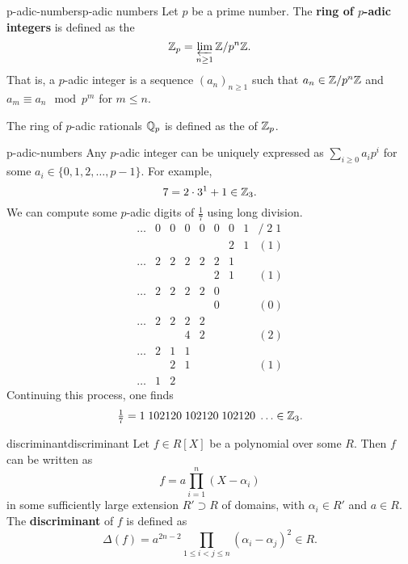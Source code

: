 \begin{topic}{p-adic-numbers}{p-adic numbers}
    Let $p$ be a prime number. The \textbf{ring of $p$-adic integers} is defined as the 
    \[ \mathbb{Z}_p = \varprojlim_{n \ge 1} \mathbb{Z} / p^n \mathbb{Z} . \]
    That is, a $p$-adic integer is a sequence $(a_n)_{n \ge 1}$ such that $a_n \in \mathbb{Z} / p^n \mathbb{Z}$ and $a_m \equiv a_n \mod p^m$ for $m \le n$.
    
    The ring of $p$-adic rationals $\mathbb{Q}_p$ is defined as the  of $\mathbb{Z}_p$.
\end{topic}

\begin{example}{p-adic-numbers}
    Any $p$-adic integer can be uniquely expressed as $\sum_{i \ge 0} a_i p^i$ for some $a_i \in \{ 0, 1, 2, \ldots, p - 1 \}$. For example,
    \[ 7 = 2 \cdot 3^1 + 1 \in \mathbb{Z}_3 . \]
    We can compute some $p$-adic digits of $\tfrac{1}{7}$ using long division.
    \[ \begin{array}{ccccccccl}
        \ldots & 0 & 0 & 0 & 0 & 0 & 0 & 1 & / \; 2 \; 1 \\
               &   &   &   &   &   & 2 & 1 & (1) \\ \hline
        \ldots & 2 & 2 & 2 & 2 & 2 & 1 \\
               &   &   &   &   & 2 & 1 &   & (1) \\ \hline
        \ldots & 2 & 2 & 2 & 2 & 0 \\
               &   &   &   &   & 0 &   &   & (0) \\ \hline
        \ldots & 2 & 2 & 2 & 2 \\
               &   &   & 4 & 2 &   &   &   & (2) \\ \hline
        \ldots & 2 & 1 & 1 \\
               &   & 2 & 1 &   &   &   &   & (1) \\ \hline
        \ldots & 1 & 2
    \end{array} \]
    Continuing this process, one finds
    \[ \tfrac{1}{7} = 1 \; 1 0 2 1 2 0 \; 1 0 2 1 2 0 \; 1 0 2 1 2 0 \; \ldots \in \mathbb{Z}_3 . \]
\end{example}

\begin{topic}{discriminant}{discriminant}
    Let $f \in R[X]$ be a polynomial over some  $R$. Then $f$ can be written as
    \[ f = a \prod_{i = 1}^n (X - \alpha_i) \]
    in some sufficiently large extension $R' \supset R$ of domains, with $\alpha_i \in R'$ and $a \in R$. The \textbf{discriminant} of $f$ is defined as
    \[ \Delta(f) = a^{2n - 2} \prod_{1 \le i < j \le n} (\alpha_i - \alpha_j)^2 \in R . \]
\end{topic}

